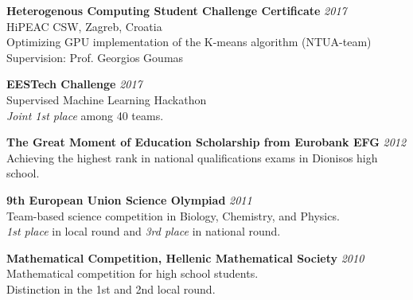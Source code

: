 \documentclass[margin]{res}
\begin{document}
\begin{resume}
\textbf{Heterogenous Computing Student Challenge Certificate}  \hfill {\em 2017} \\
HiPEAC CSW, Zagreb, Croatia \\
Optimizing GPU implementation of the K-means algorithm (NTUA-team) \\
Supervision: Prof. Georgios Goumas

\textbf{EESTech Challenge}  \hfill {\em 2017} \\ 
Supervised Machine Learning Hackathon \\
\textit{Joint 1st place} among 40 teams.

\textbf{The Great Moment of Education Scholarship from Eurobank EFG}  \hfill {\em 2012} \\ 
Achieving the highest rank in national qualifications exams in Dionisos high school.

\textbf{9th European Union Science Olympiad} \hfill {\em 2011} \\ 
Team-based science competition in Biology, Chemistry, and Physics.\\
\textit{1st place} in local round and \textit{3rd place} in  national round. 

\textbf{Mathematical Competition, Hellenic Mathematical Society} \hfill {\em 2010} \\ 
Mathematical competition for high school students. \\
Distinction in the 1st and 2nd local round. 






\end{resume}
\end{document}
